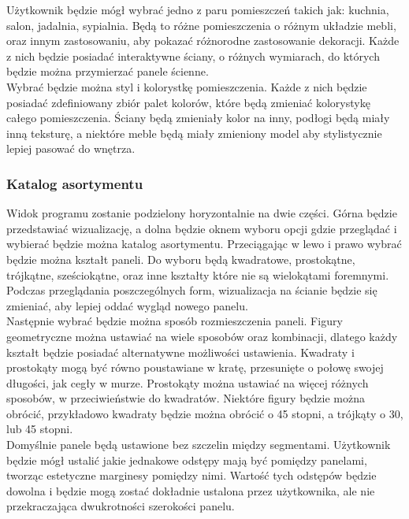 \documentclass{article} %
\begin{document}
        Użytkownik będzie mógł wybrać jedno z paru pomieszczeń takich jak: kuchnia, salon, jadalnia, sypialnia. Będą to różne pomieszczenia o różnym układzie mebli, oraz innym zastosowaniu, aby pokazać różnorodne zastosowanie dekoracji. Każde z nich będzie posiadać interaktywne ściany, o różnych wymiarach, do których będzie można przymierzać panele ścienne.
        \\
        
        Wybrać będzie można styl i kolorystkę pomieszczenia. Każde z nich będzie posiadać zdefiniowany zbiór palet kolorów, które będą zmieniać kolorystykę całego pomieszczenia. Ściany będą zmieniały kolor na inny, podłogi będą miały inną teksturę, a niektóre meble będą miały zmieniony model aby stylistycznie lepiej pasować do wnętrza.
        \\
        
        \subsubsection{Katalog asortymentu}
        Widok programu zostanie podzielony horyzontalnie na dwie części. Górna będzie przedstawiać wizualizację, a dolna będzie oknem wyboru opcji gdzie przeglądać i wybierać będzie można katalog asortymentu. Przeciągając w lewo i prawo wybrać będzie można kształt paneli. Do wyboru będą kwadratowe, prostokątne, trójkątne, sześciokątne, oraz inne kształty które nie są wielokątami foremnymi. Podczas przeglądania poszczególnych form, wizualizacja na ścianie będzie się zmieniać, aby lepiej oddać wygląd nowego panelu.
        \\
        
        Następnie wybrać będzie można sposób rozmieszczenia paneli. Figury geometryczne można ustawiać na wiele sposobów oraz kombinacji, dlatego każdy kształt będzie posiadać alternatywne możliwości ustawienia. Kwadraty i prostokąty mogą być równo poustawiane w kratę, przesunięte o połowę swojej długości, jak cegły w murze. Prostokąty można ustawiać na więcej różnych sposobów, w przeciwieństwie do kwadratów. Niektóre figury będzie można obrócić, przykładowo kwadraty będzie można obrócić o 45 stopni, a trójkąty o 30, lub 45 stopni.
        \\
        
        Domyślnie panele będą ustawione bez szczelin między segmentami. Użytkownik będzie mógł ustalić jakie jednakowe odstępy mają być pomiędzy panelami, tworząc estetyczne marginesy pomiędzy nimi. Wartość tych odstępów będzie dowolna i będzie mogą zostać dokładnie ustalona przez użytkownika, ale nie przekraczająca dwukrotności szerokości panelu.
        \\
        
\end{document}
